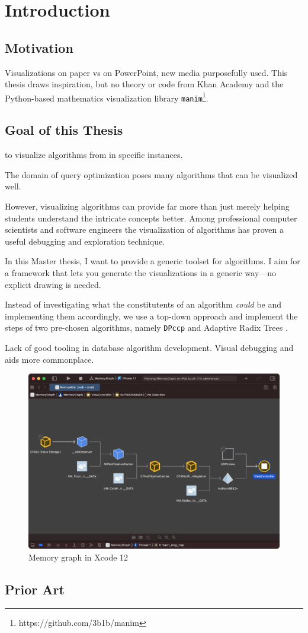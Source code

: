 \section{Introduction}

\subsection{Motivation}
Visualizations on paper vs on PowerPoint, new media purposefully used. This thesis draws inspiration, but no theory or code from Khan Academy and the Python-based mathematics visualization library \texttt{manim}\footnote{https://github.com/3b1b/manim}.

\subsection{Goal of this Thesis}
to visualize algorithms from in specific instances.

The domain of query optimization poses many algorithms that can be visualized well.

However, visualizing algorithms can provide far more than just merely helping students understand the intricate concepts better.
Among professional computer scientists and software engineers the visualization of algorithms has proven a useful debugging and exploration technique.

In this Master thesis, I want to provide a generic toolset for algorithms. I aim for a framework that lets you generate the visualizations in a generic way—no explicit drawing is needed.

Instead of investigating what the constitutents of an algorithm \textit{could} be and
implementing them accordingly, we use a top-down approach and implement the steps of
two pre-chosen algorithms, namely \texttt{DPccp} \cite{moerkotte2006analysis} and Adaptive Radix Trees \cite{leis2013adaptive}.

Lack of good tooling in database algorithm development.
Visual debugging and aids more commonplace.
\begin{figure}
    \includegraphics[width=\textwidth]{img/memoryGraph.png}
    \caption{Memory graph in Xcode 12}
\end{figure}


\subsection{Prior Art}
